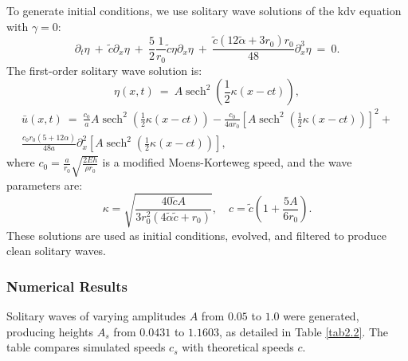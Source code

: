\documentclass[alpha-refs, 12pt]{wiley-article}
\DeclareMathOperator{\sech}{sech}
\begin{document}
To generate initial conditions, we use solitary wave solutions of the \acrfull{kdv} equation with $\gamma = 0$:
\begin{equation}\label{eq:kdvnumerical}
  \partial_t \eta\ +\ \tilde{c} \partial_x \eta\ +\ \frac{5}{2} \frac{1}{r_0} \tilde{c} \eta \partial_x \eta\ +\ \frac{\tilde{c} (12 \tilde{\alpha} + 3 r_0) r_0}{48} \partial_x^3 \eta\ =\ 0.
\end{equation}
The first-order solitary wave solution is:
\begin{equation}\label{eq:num1}
  \eta(x,t)\ =\ A \sech^2 \left( \frac{1}{2} \kappa (x - c t) \right),
\end{equation}
\begin{multline}\label{eq:num2}
  \bar{u}(x,t)\ =\ \frac{c_0}{a} A \sech^2 \left( \frac{1}{2} \kappa (x - c t) \right) - \frac{c_0}{4 a r_0} \left[ A \sech^2 \left( \frac{1}{2} \kappa (x - c t) \right) \right]^2 + \\
  \frac{c_0 r_0 (5 + 12 \alpha)}{48 a} \partial_x^2 \left[ A \sech^2 \left( \frac{1}{2} \kappa (x - c t) \right) \right],
\end{multline}
where $c_0 = \frac{a}{r_0} \sqrt{\frac{2 E h}{\rho r_0}}$ is a modified Moens-Korteweg speed, and the wave parameters are:
\[
  \kappa = \sqrt{\frac{40 \tilde{c} A}{3 r_0^2 (4 \tilde{\alpha} \tilde{c} + r_0)}}, \quad c = \tilde{c} \left( 1 + \frac{5 A}{6 r_0} \right).
\]
These solutions are used as initial conditions, evolved, and filtered to produce clean solitary waves.

\subsubsection{Numerical Results}

Solitary waves of varying amplitudes $A$ from $0.05$ to $1.0$ were generated, producing heights $A_s$ from $0.0431$ to $1.1603$, as detailed in Table \ref{tab2.2}. The table compares simulated speeds $c_s$ with theoretical speeds $c$.
\end{document}
